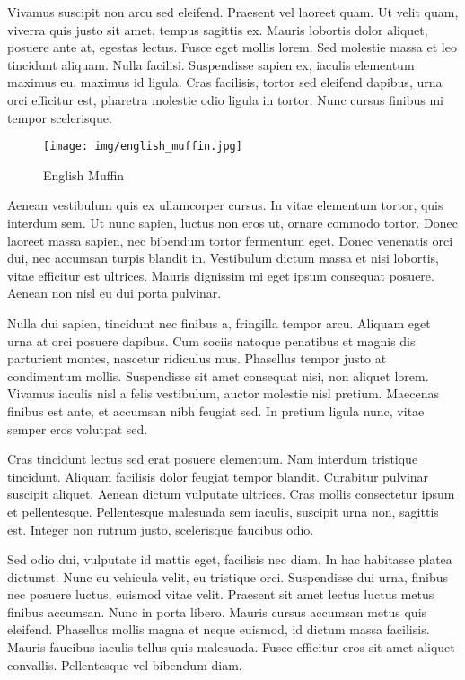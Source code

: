 \documentclass{llncs}
\begin{document}
Vivamus suscipit non arcu sed eleifend. Praesent vel laoreet quam. Ut velit quam, viverra quis justo sit amet, tempus sagittis ex. Mauris lobortis dolor aliquet, posuere ante at, egestas lectus. Fusce eget mollis lorem. Sed molestie massa et leo tincidunt aliquam. Nulla facilisi. Suspendisse sapien ex, iaculis elementum maximus eu, maximus id ligula. Cras facilisis, tortor sed eleifend dapibus, urna orci efficitur est, pharetra molestie odio ligula in tortor. Nunc cursus finibus mi tempor scelerisque.

\begin{figure}[h!]
	\begin{center}
	\texttt{[image: img/english\_muffin.jpg]}
	\caption{English Muffin \cite{Muffin:2015}}
	\label{fig:english_muffin}
	\end{center}
\end{figure}

Aenean vestibulum quis ex ullamcorper cursus. In vitae elementum tortor, quis interdum sem. Ut nunc sapien, luctus non eros ut, ornare commodo tortor. Donec laoreet massa sapien, nec bibendum tortor fermentum eget. Donec venenatis orci dui, nec accumsan turpis blandit in. Vestibulum dictum massa et nisi lobortis, vitae efficitur est ultrices. Mauris dignissim mi eget ipsum consequat posuere. Aenean non nisl eu dui porta pulvinar.

Nulla dui sapien, tincidunt nec finibus a, fringilla tempor arcu. Aliquam eget urna at orci posuere dapibus. Cum sociis natoque penatibus et magnis dis parturient montes, nascetur ridiculus mus. Phasellus tempor justo at condimentum mollis. Suspendisse sit amet consequat nisi, non aliquet lorem. Vivamus iaculis nisl a felis vestibulum, auctor molestie nisl pretium. Maecenas finibus est ante, et accumsan nibh feugiat sed. In pretium ligula nunc, vitae semper eros volutpat sed.

Cras tincidunt lectus sed erat posuere elementum. Nam interdum tristique tincidunt. Aliquam facilisis dolor feugiat tempor blandit. Curabitur pulvinar suscipit aliquet. Aenean dictum vulputate ultrices. Cras mollis consectetur ipsum et pellentesque. Pellentesque malesuada sem iaculis, suscipit urna non, sagittis est. Integer non rutrum justo, scelerisque faucibus odio.

Sed odio dui, vulputate id mattis eget, facilisis nec diam. In hac habitasse platea dictumst. Nunc eu vehicula velit, eu tristique orci. Suspendisse dui urna, finibus nec posuere luctus, euismod vitae velit. Praesent sit amet lectus luctus metus finibus accumsan. Nunc in porta libero. Mauris cursus accumsan metus quis eleifend. Phasellus mollis magna et neque euismod, id dictum massa facilisis. Mauris faucibus iaculis tellus quis malesuada. Fusce efficitur eros sit amet aliquet convallis. Pellentesque vel bibendum diam.
\end{document}
